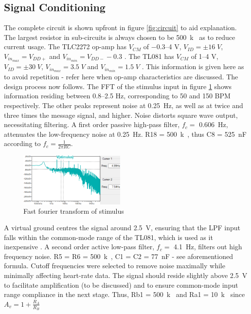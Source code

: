 	\subsection{Signal Conditioning}
The complete circuit is shown upfront in figure \ref{fig:circuit} to aid explanation. The largest resistor in sub-circuits is always chosen to be \SI{500}{k\Omega} as to reduce current usage. The TLC2272 op-amp has $V_{CM}$ of \numrange{-0.3}{4} \si{V}, $V_{ID} = \pm 16 \; V$, $V_{in_{max}} = V_{DD+}$ and $V_{in_{min}} = V_{DD-} - 0.3$ \cite{tlc2272}. The TL081 has $V_{CM}$ of \numrange{1}{4} \si{V}, $V_{ID} = \pm 30 \;V$, $V_{in_{max}} = 3.5 \;V$ and $V_{in_{min}} = 1.5 \;V$ \cite{tl081}. This information is given here as to avoid repetition - refer here when op-amp characteristics are discussed. The design process now follows.
The FFT of the stimulus input in figure \ref{fig:fft} shows information residing between \numrange{0.8}{2.5} \si{Hz}, corresponding to 50 and 150 BPM respectively. The other peaks represent noise at \SI{0.25}{Hz}, as well as at twice and three times the message signal, and higher. Noise distorts square wave output, necessitating filtering. A first order passive high-pass filter, $f_c =$ \SI{0.606}{Hz}, attenuates the low-frequency noise at \SI{0.25}{Hz}. R18 = \SI{500}{k\Omega}, thus C8 = \SI{525}{nF} according to $f_{c} = \frac{1}{2\pi R C}$. 
\begin{figure}
    \centering
    \includegraphics[width = 0.47\textwidth]{./Figures/fft}
    \caption{Fast fourier transform of stimulus}
    \label{fig:fft}
\end{figure}
A virtual ground centres the signal around \SI{2.5}{V}, ensuring that the LPF input falls within the common-mode range of the TL081, which is used as it inexpensive \cite{octo}. A second order active low-pass filter, $f_c =$ \SI{4.1}{Hz}, filters out high frequency noise. R5 = R6 = \SI{500}{k\Omega}, C1 = C2 = \SI{77}{nF} - see aforementioned formula. Cutoff frequencies were selected to remove noise maximally while minimally affecting heart-rate data. The signal should reside slightly above \SI{2.5}{V} to facilitate amplification (to be discussed) and to ensure common-mode input range compliance in the next stage. Thus, Rb1 = \SI{500}{k\Omega} and Ra1 = \SI{10}{k\Omega} since $A_v=1+\frac{R_{A}}{R_{B}}$ 
